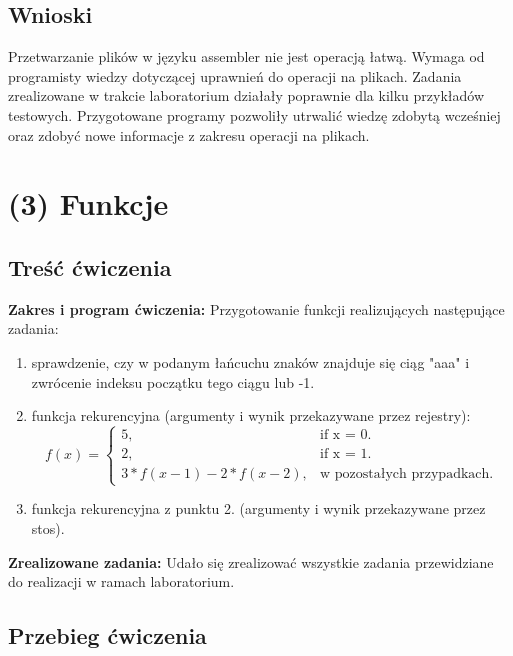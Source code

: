 \documentclass[a4paper,12pt]{article}
\begin{document}
\subsection{Wnioski}
Przetwarzanie plików w języku assembler nie jest operacją łatwą. Wymaga od programisty wiedzy dotyczącej uprawnień do operacji na plikach. Zadania zrealizowane w trakcie laboratorium działały poprawnie dla kilku przykładów testowych. Przygotowane programy pozwoliły utrwalić wiedzę zdobytą wcześniej oraz zdobyć nowe informacje z zakresu operacji na plikach.
\newpage
\section{(3) Funkcje}
\subsection{Treść ćwiczenia}
\textbf{Zakres i program ćwiczenia:}
Przygotowanie funkcji realizujących następujące zadania:
\begin{enumerate}
	\item sprawdzenie, czy w podanym łańcuchu znaków znajduje się ciąg "aaa" i zwrócenie indeksu początku tego ciągu lub -1. 
	\item funkcja rekurencyjna (argumenty i wynik przekazywane przez rejestry):
	\begin{equation}
		f(x)=\begin{cases}
			5, & \text{if x = 0}.\\
			2, & \text{if x = 1}.\\
			3*f(x-1)-2*f(x-2), & \text{w pozostałych przypadkach}.
		\end{cases}
	\end{equation}
	\item funkcja rekurencyjna z punktu 2. (argumenty i wynik przekazywane przez stos).
\end{enumerate}
\textbf{Zrealizowane zadania:}
Udało się zrealizować wszystkie zadania przewidziane do realizacji w ramach laboratorium.
\subsection{Przebieg ćwiczenia}
\end{document}
